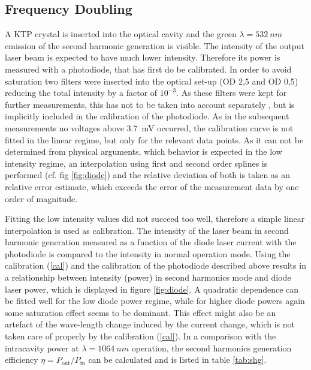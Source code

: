 \documentclass[a4paper]{scrartcl}
\numberwithin{equation}{section}
\numberwithin{figure}{section}
\numberwithin{table}{section}
\newcommand{\Formel}[1]{(\ref{#1})}
\begin{document}
\subsection{Frequency Doubling}
A KTP crystal is inserted into the optical cavity and the green $\lambda =\SI{532}{nm}$ emission of the second harmonic generation is visible. The intensity of the output laser beam is expected to have much lower intensity. Therefore its power is measured with a photodiode, that has first do be calibrated. In order to avoid saturation two filters were inserted into the optical set-up (OD 2,5 and OD 0,5) reducing the total intensity by a factor of $10^{-3}$. As these filters were kept for further measurements, this has not to be taken into account separately , but is implicitly included in the calibration of the photodiode. As in the subsequent measurements no voltages above \SI{3.7}{mV} occurred, the calibration curve is not fitted in the linear regime, but only for the relevant data points. As it can not be determined from physical arguments, which behavior is expected in the low intensity regime, an interpolation using first and second order splines is performed (cf. fig \ref{fig:diode}) and the relative deviation of both is taken as an relative error estimate, which exceeds the error of the measurement data by one order of magnitude. 

Fitting the low intensity values did not succeed too well, therefore a simple linear interpolation is used as calibration. The intensity of the laser beam in second harmonic generation measured as a function of the diode laser current with the photodiode is compared to the intensity in normal operation mode. Using the calibration \Formel{cal} and the calibration of the photodiode described above results in a relationship between intensity (power) in second harmonics mode and diode laser power, which is displayed in figure \ref{fig:diode}. A quadratic dependence can be fitted well for the low diode power regime, while for higher diode powers again some saturation effect seems to be dominant. This effect might also be an artefact of the wave-length change induced by the current change, which is not taken care of properly by the calibration \Formel{cal}. In a comparison with the intracavity power at $\lambda=\SI{1064}{nm}$ operation, the second harmonics generation efficiency $\eta=P_\text{out}/P_\text{in}$ can be calculated and is listed in table \ref{tab:shg}.
\end{document}
